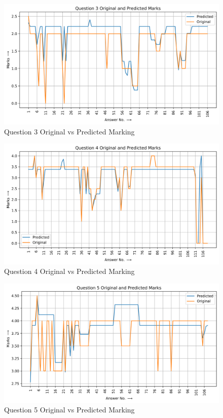 \begin{figure}[H]
    \centering
    \includegraphics[width=1\linewidth]{IMAGE/q3_Marking.png}
    \caption{Question 3 Original vs Predicted Marking}
    \label{fig33}
\end{figure}

\begin{figure}[H]
    \centering
    \includegraphics[width=1\linewidth]{IMAGE/q4_Marking.png}
    \caption{Question 4 Original vs Predicted Marking}
    \label{fig34}
\end{figure}

\begin{figure}[H]
    \centering
    \includegraphics[width=1\linewidth]{IMAGE/q5_Marking.png}
    \caption{Question 5 Original vs Predicted Marking}
    \label{fig35}
\end{figure}

